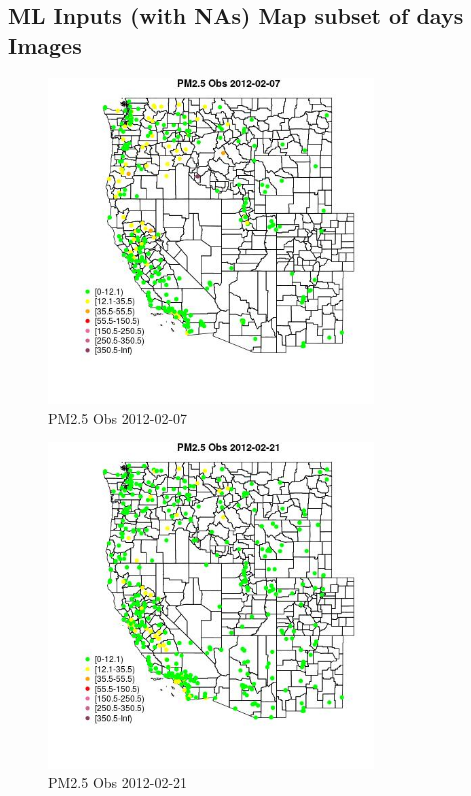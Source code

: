 
\subsection{ML Inputs (with NAs) Map subset of days Images} 
 

\begin{figure} 
\centering  
\includegraphics[width=0.77\textwidth]{Code_Outputs/Report_ML_input_PM25_Step4_part_f_de_duplicated_aveswNAs_MapObsPM25_Obs2012-02-07.jpg} 
\caption{\label{fig:Report_ML_input_PM25_Step4_part_f_de_duplicated_aveswNAsMapObsPM25_Obs2012-02-07}PM2.5 Obs 2012-02-07} 
\end{figure} 
 

\begin{figure} 
\centering  
\includegraphics[width=0.77\textwidth]{Code_Outputs/Report_ML_input_PM25_Step4_part_f_de_duplicated_aveswNAs_MapObsPM25_Obs2012-02-21.jpg} 
\caption{\label{fig:Report_ML_input_PM25_Step4_part_f_de_duplicated_aveswNAsMapObsPM25_Obs2012-02-21}PM2.5 Obs 2012-02-21} 
\end{figure} 
 

